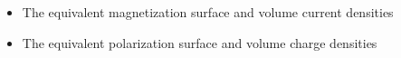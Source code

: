 \begin{ELjoin}

\begin{itemize}
\tightlist
\item
  The equivalent magnetization surface and volume current densities
\end{itemize}

\begin{ELimportant}{}


\end{ELimportant}

\end{ELjoin}

\begin{ELunit}

\begin{itemize}
\tightlist
\item
  The equivalent polarization surface and volume charge densities
\end{itemize}


\end{ELunit}


